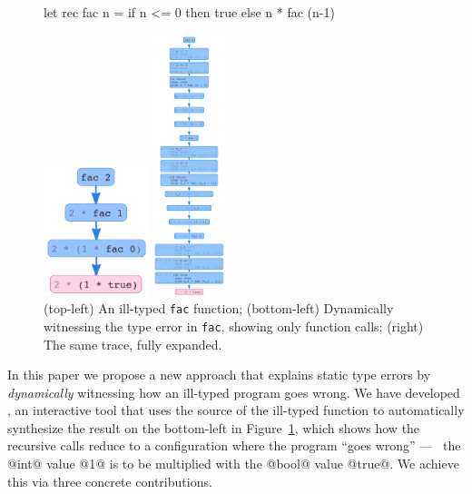 \begin{figure}[t]
\centering
\begin{minipage}{.49\linewidth}
\centering
\begin{code}
  let rec fac n =
    if n <= 0 then
      true
    else
      n * fac (n-1)
\end{code}
\vspace{3em}
\centering
  \includegraphics[height=1.5in]{fac-overview.png}
\end{minipage}
\begin{minipage}{.49\linewidth}
\centering
\includegraphics[height=3in]{fac-long.png}
\end{minipage}
\caption{(top-left) An ill-typed \texttt{fac} function; (bottom-left) Dynamically witnessing the type error in \texttt{fac}, showing only function calls; (right) The same trace, fully expanded.}
\label{fig:factorial}
\end{figure}

In this paper we propose a new approach that explains
static type errors by \emph{dynamically} witnessing
how an ill-typed program goes wrong.
%
We have developed \toolname, an interactive tool that uses
the source of the ill-typed function to automatically synthesize
the result on the bottom-left in Figure~\ref{fig:factorial}, which
shows how the recursive calls reduce to a configuration where
the program ``goes wrong'' --- \ie\ the @int@ value @1@ is to be
multiplied with the @bool@ value @true@.
We achieve this via three concrete contributions.

